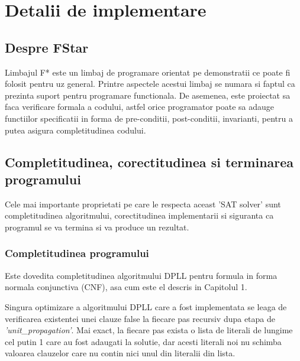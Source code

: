 \chapter{Detalii de implementare}


\section{Despre FStar}

Limbajul F* este un limbaj de programare orientat pe demonstratii ce poate fi \newline folosit pentru uz general. Printre aspectele acestui limbaj se numara si faptul ca \newline prezinta suport pentru programare functionala. De asemenea, este proiectat sa faca verificare formala a codului, astfel orice programator poate sa adauge functiilor \newline specificatii in forma de pre-conditii, post-conditii, invarianti, pentru a putea asigura completitudinea codului.

\section{Completitudinea, corectitudinea si  \newline terminarea programului}

Cele mai importante proprietati pe care le respecta aceast 'SAT solver' sunt \newline completitudinea algoritmului, corectitudinea implementarii si siguranta ca programul se va termina si va produce un rezultat.

\subsection{Completitudinea programului}

Este dovedita completitudinea algoritmului DPLL pentru formula in forma normala conjunctiva (CNF), asa cum este el descris in Capitolul 1.

Singura optimizare a algoritmului DPLL care a fost implementata se leaga de  \newline verificarea existentei unei clauze false la fiecare pas recursiv dupa etapa de \textit{'unit\_propagation'}. \newpage Mai exact, la fiecare pas exista o lista de literali de lungime cel putin 1 care au fost  \newline adaugati la solutie, dar acesti literali noi nu schimba valoarea clauzelor care nu contin nici unul din literalii din lista.
 
